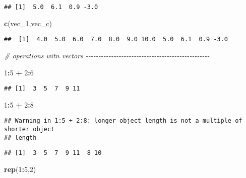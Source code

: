 \documentclass[
]{article}
\newenvironment{Shaded}{\begin{snugshade}}{\end{snugshade}}
\newcommand{\CommentTok}[1]{\textcolor[rgb]{0.56,0.35,0.01}{\textit{#1}}}
\newcommand{\DecValTok}[1]{\textcolor[rgb]{0.00,0.00,0.81}{#1}}
\newcommand{\FunctionTok}[1]{\textcolor[rgb]{0.13,0.29,0.53}{\textbf{#1}}}
\newcommand{\NormalTok}[1]{#1}
\newcommand{\SpecialCharTok}[1]{\textcolor[rgb]{0.81,0.36,0.00}{\textbf{#1}}}
\begin{document}
\begin{verbatim}
## [1]  5.0  6.1  0.9 -3.0
\end{verbatim}

\begin{Shaded}
\begin{Highlighting}[]
\FunctionTok{c}\NormalTok{(vec\_1,vec\_c)}
\end{Highlighting}
\end{Shaded}

\begin{verbatim}
##  [1]  4.0  5.0  6.0  7.0  8.0  9.0 10.0  5.0  6.1  0.9 -3.0
\end{verbatim}

\begin{Shaded}
\begin{Highlighting}[]
\CommentTok{\# operations witn vectors {-}{-}{-}{-}{-}{-}{-}{-}{-}{-}{-}{-}{-}{-}{-}{-}{-}{-}{-}{-}{-}{-}{-}{-}{-}{-}{-}{-}{-}{-}{-}{-}{-}{-}{-}{-}{-}{-}{-}{-}{-}{-}{-}{-}{-}{-}{-}{-}{-}}


\DecValTok{1}\SpecialCharTok{:}\DecValTok{5} \SpecialCharTok{+} \DecValTok{2}\SpecialCharTok{:}\DecValTok{6}
\end{Highlighting}
\end{Shaded}

\begin{verbatim}
## [1]  3  5  7  9 11
\end{verbatim}

\begin{Shaded}
\begin{Highlighting}[]
\DecValTok{1}\SpecialCharTok{:}\DecValTok{5} \SpecialCharTok{+} \DecValTok{2}\SpecialCharTok{:}\DecValTok{8}
\end{Highlighting}
\end{Shaded}

\begin{verbatim}
## Warning in 1:5 + 2:8: longer object length is not a multiple of shorter object
## length
\end{verbatim}

\begin{verbatim}
## [1]  3  5  7  9 11  8 10
\end{verbatim}

\begin{Shaded}
\begin{Highlighting}[]
\FunctionTok{rep}\NormalTok{(}\DecValTok{1}\SpecialCharTok{:}\DecValTok{5}\NormalTok{,}\DecValTok{2}\NormalTok{)}
\end{Highlighting}
\end{Shaded}
\end{document}
